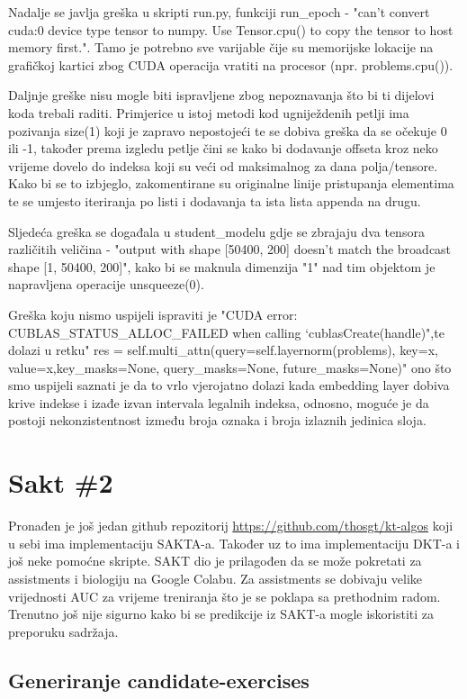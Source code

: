 		Nadalje se javlja greška u skripti run.py, funkciji run\_epoch - "can't convert cuda:0 device type tensor to numpy. Use Tensor.cpu() to copy the tensor to host memory first.". Tamo je potrebno sve varijable čije su memorijske lokacije na grafičkoj kartici zbog CUDA operacija vratiti na procesor (npr. problems.cpu()).
		
		Daljnje greške nisu mogle biti ispravljene zbog nepoznavanja što bi ti dijelovi koda trebali raditi. Primjerice u istoj metodi kod ugniježdenih petlji ima pozivanja size(1) koji je zapravo nepostojeći te se dobiva greška da se očekuje 0 ili -1, također prema izgledu petlje čini se kako bi dodavanje offseta kroz neko vrijeme dovelo do indeksa koji su veći od maksimalnog za dana polja/tensore. Kako bi se to izbjeglo, zakomentirane su originalne linije pristupanja elementima te se umjesto iteriranja po listi i dodavanja ta ista lista appenda na drugu.
		
		Sljedeća greška se događala u student\_modelu gdje se zbrajaju dva tensora različitih veličina - "output with shape [50400, 200] doesn't match the broadcast shape [1, 50400, 200]", kako bi se maknula dimenzija "1" nad tim objektom je napravljena operacije unsqueeze(0).
		
		Greška koju nismo uspijeli ispraviti je "CUDA error: CUBLAS\_STATUS\_ALLOC\_FAILED when calling `cublasCreate(handle)",te dolazi u
		retku" res = self.multi\_attn(query=self.layernorm(problems), key=x, value=x,key\_masks=None, query\_masks=None, future\_masks=None)" ono što smo uspijeli saznati je da to vrlo vjerojatno dolazi kada embedding layer dobiva krive indekse i izađe izvan intervala legalnih indeksa, odnosno, moguće je da postoji nekonzistentnost između broja oznaka i broja izlaznih jedinica sloja.
		
	\section{Sakt \#2}
		Pronađen je još jedan github repozitorij \url{https://github.com/thosgt/kt-algos} koji u sebi ima implementaciju SAKTA-a. Također uz to ima implementaciju DKT-a i još neke pomoćne skripte. SAKT dio je prilagođen da se može pokretati za assistments i biologiju na Google Colabu. Za assistments se dobivaju velike vrijednosti AUC za vrijeme treniranja što je se poklapa sa prethodnim radom. Trenutno još nije sigurno kako bi se predikcije iz SAKT-a mogle iskoristiti za preporuku sadržaja.
	
		\subsection{Generiranje candidate-exercises}
		

